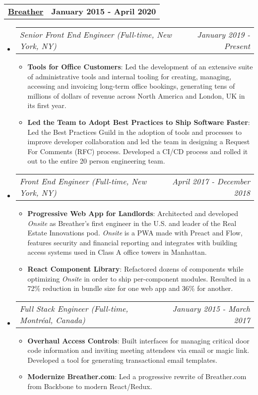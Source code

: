 \documentclass[letterpaper,10.8pt]{article}
\makeatletter
\newcommand{\resumeItem}[2]{
  \item\small{
    \textbf{#1}{: #2 \vspace{-2pt}}
  }
}
\newcommand{\jobLineItem}[2]{
  \vspace{0pt}\item[]
    \begin{tabular*}{0.98\textwidth}{l@{\extracolsep{\fill}}r}
      \textit{#1} & \textit{\small #2} \\
    \end{tabular*}\vspace{-4pt}
}
\newcommand{\employerTitle}[3]{
  \begin{tabular*}{1\textwidth}{l@{\extracolsep{\fill}}r}
    \href{#1}{\textbf{#2}} & \textbf{#3} \\
  \end{tabular*}\vspace{-4pt}
}
\newcommand{\resumeSubHeadingListStart}{\begin{itemize}[leftmargin=*]}
\newcommand{\resumeSubHeadingListEnd}{\end{itemize}}
\newcommand{\resumeItemListStart}{\begin{itemize}}
\newcommand{\resumeItemListEnd}{\end{itemize}\vspace{-5pt}}
\makeatother
\begin{document}
  \employerTitle
    {https://breather.com}{Breather}{January 2015 - April 2020}
  \resumeSubHeadingListStart
    \jobLineItem
        {Senior Front End Engineer (Full-time, New York, NY)}{January 2019 - Present}
    \resumeItemListStart
        \resumeItem{Tools for Office Customers}
        {Led the development of an extensive suite of administrative tools and internal tooling for creating, managing, accessing and invoicing long-term office bookings, generating tens of millions of dollars of revenue across North America and London, UK in its first year.}
        \resumeItem{Led the Team to Adopt Best Practices to Ship Software Faster}
        {Led the Best Practices Guild in the adoption of tools and processes to improve developer collaboration and led the team in designing a Request For Comments (RFC) process. Developed a CI/CD process and rolled it out to the entire 20 person engineering team.}
    \resumeItemListEnd
    \jobLineItem
        {Front End Engineer (Full-time, New York, NY)}{April 2017 - December 2018}
    \resumeItemListStart
        \resumeItem{Progressive Web App for Landlords}
        {Architected and developed \textit{Onsite} as Breather’s first engineer in the U.S. and leader of the Real Estate Innovations pod. \textit{Onsite} is a PWA made with Preact and Flow, features security and financial reporting and integrates with building access systems used in Class A office towers in Manhattan.}
        \resumeItem{React Component Library}
        {Refactored dozens of components while optimizing \textit{Onsite} in order to ship per-component modules. Resulted in a 72\% reduction in bundle size for one web app and 36\% for another.}
      \resumeItemListEnd
    \jobLineItem
		    {Full Stack Engineer (Full-time, Montréal, Canada)}{January 2015 - March 2017}
		\resumeItemListStart
        \resumeItem{Overhaul Access Controls}
        {Built interfaces for managing critical door code information and inviting meeting attendees via email or magic link. Developed a tool for generating transactional email templates.}
        \resumeItem{Modernize Breather.com}
        {Led a progressive rewrite of Breather.com from Backbone to modern React/Redux.}
    \resumeItemListEnd
    \resumeSubHeadingListEnd

\end{document}
